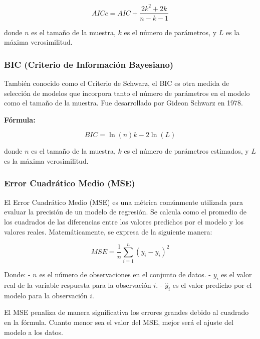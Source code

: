 \documentclass[
  11pt,
  bookmarksnumbered]{article}
\begin{document}

\begin{equation}
AICc = AIC + \frac{2k^2 + 2k}{n - k - 1}\end{equation}

donde \(n\) es el tamaño de la muestra, \(k\) es el número de parámetros, y \(L\) es la máxima verosimilitud.

\hypertarget{bic-criterio-de-informaciuxf3n-bayesiano}{%
\subsubsection{BIC (Criterio de Información Bayesiano)}\label{bic-criterio-de-informaciuxf3n-bayesiano}}

También conocido como el Criterio de Schwarz, el BIC es otra medida de selección de modelos que incorpora tanto el número de parámetros en el modelo como el tamaño de la muestra.
Fue desarrollado por Gideon Schwarz en 1978.

\textbf{Fórmula:}


\begin{equation} BIC = \ln(n)k - 2\ln(L) \end{equation}

donde \(n\) es el tamaño de la muestra, \(k\) es el número de parámetros estimados, y \(L\) es la máxima verosimilitud.

\hypertarget{error-cuadruxe1tico-medio-mse}{%
\subsubsection{Error Cuadrático Medio (MSE)}\label{error-cuadruxe1tico-medio-mse}}

El Error Cuadrático Medio (MSE) es una métrica comúnmente utilizada para evaluar la precisión de un modelo de regresión.
Se calcula como el promedio de los cuadrados de las diferencias entre los valores predichos por el modelo y los valores reales.
Matemáticamente, se expresa de la siguiente manera:

\[MSE = \frac{1}{n} \sum_{i=1}^{n} (y_i - \hat{y}_i)^2\]

Donde: - \(n\) es el número de observaciones en el conjunto de datos.
- \(y_i\) es el valor real de la variable respuesta para la observación \(i\).
- \(\hat{y}_i\) es el valor predicho por el modelo para la observación \(i\).

El MSE penaliza de manera significativa los errores grandes debido al cuadrado en la fórmula.
Cuanto menor sea el valor del MSE, mejor será el ajuste del modelo a los datos.
\end{document}
